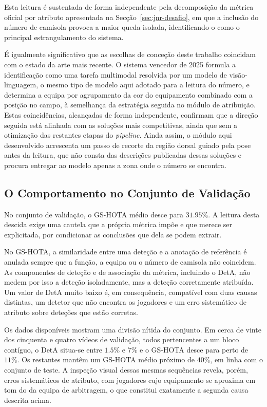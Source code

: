 Esta leitura é sustentada de forma independente pela decomposição da métrica oficial por atributo apresentada na Secção~\ref{sec:jnr-desafio}, em que a inclusão do número de camisola provoca a maior queda isolada, identificando-o como o principal estrangulamento do sistema.

É igualmente significativo que as escolhas de conceção deste trabalho coincidam com o estado da arte mais recente. O sistema vencedor de 2025 formula a identificação como uma tarefa multimodal resolvida por um modelo de visão-linguagem, o mesmo tipo de modelo aqui adotado para a leitura do número, e determina a equipa por agrupamento da cor do equipamento combinado com a posição no campo, à semelhança da estratégia seguida no módulo de atribuição. Estas coincidências, alcançadas de forma independente, confirmam que a direção seguida está alinhada com as soluções mais competitivas, ainda que sem a otimização das restantes etapas do \emph{pipeline}. Ainda assim, o módulo aqui desenvolvido acrescenta um passo de recorte da região dorsal guiado pela pose antes da leitura, que não consta das descrições publicadas dessas soluções e procura entregar ao modelo apenas a zona onde o número se encontra.

\subsection{O Comportamento no Conjunto de Validação}

No conjunto de validação, o GS-HOTA médio desce para $31.95\%$. A leitura desta descida exige uma cautela que a própria métrica impõe e que merece ser explicitada, por condicionar as conclusões que dela se podem extrair.

No GS-HOTA, a similaridade entre uma deteção e a anotação de referência é anulada sempre que a função, a equipa ou o número de camisola não coincidem. As componentes de deteção e de associação da métrica, incluindo o DetA, não medem por isso a deteção isoladamente, mas a deteção corretamente atribuída. Um valor de DetA muito baixo é, em consequência, compatível com duas causas distintas, um detetor que não encontra os jogadores e um erro sistemático de atributo sobre deteções que estão corretas.

Os dados disponíveis mostram uma divisão nítida do conjunto. Em cerca de vinte dos cinquenta e quatro vídeos de validação, todos pertencentes a um bloco contíguo, o DetA situa-se entre $1.5\%$ e $7\%$ e o GS-HOTA desce para perto de $11\%$. Os restantes mantêm um GS-HOTA médio próximo de $40\%$, em linha com o conjunto de teste. A inspeção visual dessas mesmas sequências revela, porém, erros sistemáticos de atributo, com jogadores cujo equipamento se aproxima em tom do da equipa de arbitragem, o que constitui exatamente a segunda causa descrita acima.

